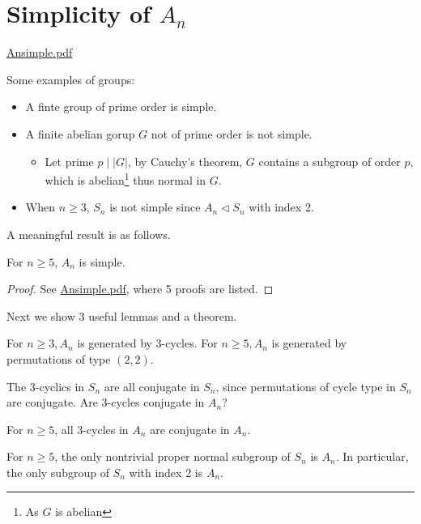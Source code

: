 \section{Simplicity of \texorpdfstring{$A_n$}{A_n}}

\href{https://kconrad.math.uconn.edu/blurbs/grouptheory/Ansimple.pdf}{Ansimple.pdf}

Some examples of groups:

\begin{itemize}
	\item A finte group of prime order is simple.
	\item A finite abelian gorup $G$ not of prime order is not simple.
	\begin{itemize}
		\item Let prime $p\mid \lvert G \rvert$, by Cauchy's theorem, $G$ contains a subgroup of order $p$, which is abelian\footnote{As $G$ is abelian} thus normal in $G$.
	\end{itemize}
	\item When $n\geq3$, $S_n$ is not simple since $A_n\lhd S_n$ with index 2.
\end{itemize}

A meaningful result is as follows.

\begin{theorem}
For $n\geq5$, $A_n$ is simple.
\end{theorem}
\begin{proof}
See \href{https://kconrad.math.uconn.edu/blurbs/grouptheory/Ansimple.pdf}{Ansimple.pdf}, where 5 proofs are listed.
\end{proof}

Next we show 3 useful lemmas and a theorem.

\begin{lemma}
For $n \geq 3, A_n$ is generated by 3-cycles. For $n \geq 5, A_n$ is generated by permutations of type $(2,2)$.
\end{lemma}
The 3-cyclics in $S_n$ are all conjugate in $S_n$, since permutations of cycle type in $S_n$ are conjugate. Are 3-cycles conjugate in $A_n$?

\begin{lemma}
For $n \geq 5$, all 3-cycles in $A_n$ are conjugate in $A_n$.
\end{lemma}
\begin{lemma}
For $n \geq 5$, the only nontrivial proper normal subgroup of $S_n$ is $A_n$. In particular, the only subgroup of $S_n$ with index 2 is $A_n$.\label{c45dad}
\end{lemma}

